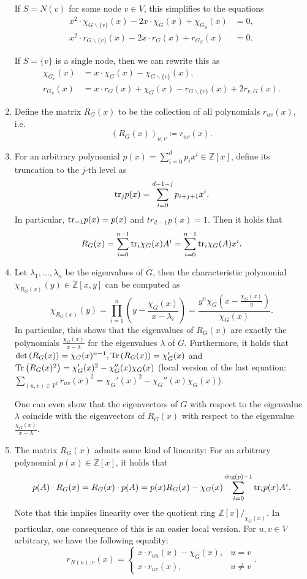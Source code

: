 \documentclass[a4paper,12pt]{article}
\begin{document}
\begin{enumerate}
If $S = N(v)$ for some node $v\in V$, this simplifies to the equations
\begin{align*}
x^2\cdot\chi_{G\backslash\{v\}}(x) - 2x\cdot\chi_G(x) + \chi_{G_S}(x) &= 0,\\
x^2\cdot r_{G\backslash\{v\}}(x) - 2x\cdot r_G(x) + r_{G_S}(x) &= 0.
\end{align*}

If $S = \{v\}$ is a single node, then we can rewrite this as
\begin{align*}
\chi_{G_v}(x) &= x \cdot\chi_G(x)-\chi_{G\backslash\{v\}}(x),\\
r_{G_u}(x) &= x \cdot r_G(x) + \chi_G(x) - r_{G\backslash\{v\}}(x)+2r_{v,G}(x).
\end{align*}

\item 
Define the matrix $R_G(x)$ to be the collection of all polynomials $r_{uv}(x)$, i.e.
$$
\left(R_G(x)\right)_{u,v} \coloneqq r_{uv}(x).
$$

\item 
For an arbitrary polynomial $p(x) = \sum_{i=0}^d p_ix^i \in \mathbb{Z}[x]$, define its truncation to the $j$-th level as
$$
\mathrm{tr}_jp(x) = \sum_{i=0}^{d-1-j}p_{i+j+1}x^i.
$$
In particular, $\mathrm{tr}_{-1}p(x) = p(x)$ and $tr_{d-1}p(x) = 1$. Then it holds that
$$
R_G(x) = \sum_{i=0}^{n-1}\mathrm{tr}_i\chi_G(x)A^i = \sum_{i=0}^{n-1}\mathrm{tr}_i\chi_G(A)x^i.
$$

\item 
Let $\lambda_1, \ldots, \lambda_n$ be the eigenvalues of $G$, then the characteristic polynomial $\chi_{R_G(x)}(y) \in \mathbb{Z}[x,y]$ can be computed as
$$
\chi_{R_G(x)}(y) = \prod_{i=1}^n\left(y - \frac{\chi_G(x)}{x-\lambda_i}\right) = \frac{y^n \chi_G\left(x-\frac {\chi_G(x)}y\right)}{\chi_G(x)}.
$$
In particular, this shows that the eigenvalues of $R_G(x)$ are exactly the polynomials $\frac{\chi_G(x)}{x-\lambda}$ for the eigenvalues $\lambda$ of $G$. Furthermore, it holds that $\det\left(R_G(x)\right) = \chi_G(x)^{n-1}, \mathrm{Tr}\left(R_G(x)\right) = \chi_G'(x)$ and $\mathrm{Tr}\left(R_G(x)^2\right) = \chi_G'(x)^2 - \chi_G''(x)\chi_G(x)$ (local version of the last equation: $\sum_{(u,v)\in V^2}r_{uv}(x)^2 = \chi_G'(x)^2 - \chi_G''(x)\chi_G(x)$).

One can even show that the eigenvectors of $G$ with respect to the eigenvalue $\lambda$ coincide with the eigenvectors of $R_G(x)$ with respect to the eigenvalue $\frac{\chi_G(x)}{x-\lambda}$.

\item 
The matrix $R_G(x)$ admits some kind of linearity: For an arbitrary polynomial $p(x) \in \mathbb{Z}[x]$, it holds that
$$
p(A) \cdot R_G(x) = R_G(x) \cdot p(A) = p(x) R_G(x) - \chi_G(x) \sum_{i=0}^{\deg(p)-1} \mathrm{tr}_ip(x)A^i.
$$
Note that this implies linearity over the quotient ring $\mathbb{Z}[x]/_{\chi_G(x)}$.
In particular, one consequence of this is an easier local version. For $u,v \in V$ arbitrary, we have the following equality:
$$
r_{N(u),v}(x) = \begin{cases}
x \cdot r_{uu}(x) - \chi_G(x), & u = v\\
x \cdot r_{uv}(x), & u \neq v
\end{cases}.
$$


\end{enumerate}
\end{document}

